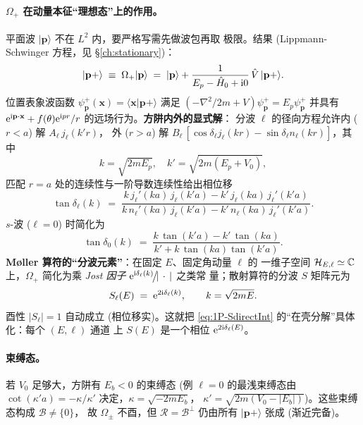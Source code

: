 \paragraph{$\Omega_+$ 在动量本征“理想态”上的作用。}
平面波 $|\mathbf{p}\rangle$ 不在 $L^2$ 内，要严格写需先做波包再取
极限。结果 (Lippmann-Schwinger 方程，见 \S\ref{ch:stationary})：
\begin{equation}
  |\mathbf{p}+\rangle \;\equiv\; \Omega_+|\mathbf{p}\rangle
  \;=\; |\mathbf{p}\rangle + \frac{1}{E_p-\hat{H}_0+\mathrm{i} 0}\,\hat{V}\,|\mathbf{p}+\rangle.
  \label{eq:1P-ex-LS}
\end{equation}
位置表象波函数 $\psi^+_\mathbf{p}(\mathbf{x})=\langle\mathbf{x}|
\mathbf{p}+\rangle$ 满足 $(-\nabla^2/2m + V)\psi^+_\mathbf{p}
=E_p\psi^+_\mathbf{p}$ 并具有 $\mathrm{e}^{\mathrm{i}\mathbf{p}\cdot\mathbf{x}}
+f(\theta)\mathrm{e}^{\mathrm{i} p r}/r$ 的远场行为。\textbf{方阱内外的显式解}：
分波 $\ell$ 的径向方程允许内 ($r<a$) 解 $A_\ell\,j_\ell(k'r)$，
外 ($r>a$) 解 $B_\ell\,[\cos\delta_\ell j_\ell(kr)
-\sin\delta_\ell n_\ell(kr)]$，其中
\begin{equation}
  k=\sqrt{2mE_p},\quad k'=\sqrt{2m(E_p+V_0)},
  \label{eq:1P-ex-kkprime}
\end{equation}
匹配 $r=a$ 处的连续性与一阶导数连续性给出相位移
\begin{equation}
  \tan\delta_\ell(k)
  \;=\;\frac{k\,j_\ell'(ka)\,j_\ell(k'a)
            -k'\,j_\ell(ka)\,j_\ell'(k'a)}
            {k\,n_\ell'(ka)\,j_\ell(k'a)
            -k'\,n_\ell(ka)\,j_\ell'(k'a)}.
  \label{eq:1P-ex-deltaL}
\end{equation}
$s$-波 ($\ell=0$) 时简化为
\begin{equation}
  \tan\delta_0(k) \;=\;
  \frac{k\,\tan(k'a) - k'\,\tan(ka)}{k' + k\,\tan(ka)\tan(k'a)}.
  \label{eq:1P-ex-deltaS}
\end{equation}
\textbf{Møller 算符的“分波元素”}：在固定 $E$、固定角动量 $\ell$ 的
一维子空间 $\mathcal{H}_{E,\ell}\simeq\mathbb{C}$ 上，$\Omega_+$ 简化为乘
\emph{Jost 因子} $\mathrm{e}^{\mathrm{i}\delta_\ell(k)}\!\bigl/\!|\,\cdot\,|$ 之类常
量；散射算符的分波 $S$ 矩阵元为
\begin{equation}
  S_\ell(E) \;=\; \mathrm{e}^{2\mathrm{i}\delta_\ell(k)},\qquad
  k=\sqrt{2mE}.
  \label{eq:1P-ex-Sl}
\end{equation}
酉性 $|S_\ell|=1$ 自动成立 (相位移实)。这就把
\eqref{eq:1P-SdirectInt} 的“在壳分解”具体化：每个 $(E,\ell)$ 通道
上 $S(E)$ 是一个相位 $\mathrm{e}^{2\mathrm{i}\delta_\ell(E)}$。

\paragraph{束缚态。}
若 $V_0$ 足够大，方阱有 $E_b<0$ 的束缚态 (例 $\ell=0$ 的最浅束缚态由
$\cot(\kappa' a)=-\kappa/\kappa'$ 决定，$\kappa=\sqrt{-2mE_b}$，
$\kappa'=\sqrt{2m(V_0-|E_b|)}$)。这些束缚态构成 $\mathscr{B}\neq\{0\}$，
故 $\Omega_\pm$ 不酉，但 $\mathcal{R}=\mathscr{B}^\perp$ 仍由所有
$|\mathbf{p}+\rangle$ 张成 (渐近完备)。

